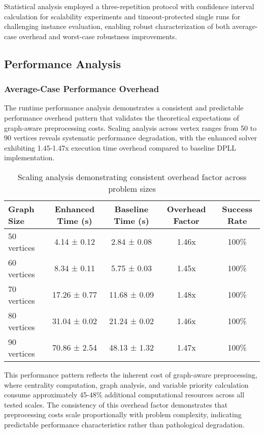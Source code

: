 Statistical analysis employed a three-repetition protocol with confidence interval calculation for scalability experiments and timeout-protected single runs for challenging instance evaluation, enabling robust characterization of both average-case overhead and worst-case robustness improvements.

\subsection{Performance Analysis}

\subsubsection{Average-Case Performance Overhead}

The runtime performance analysis demonstrates a consistent and predictable performance overhead pattern that validates the theoretical expectations of graph-aware preprocessing costs. Scaling analysis across vertex ranges from 50 to 90 vertices reveals systematic performance degradation, with the enhanced solver exhibiting 1.45-1.47x execution time overhead compared to baseline DPLL implementation.

\begin{table}[h]
\centering
\begin{tabular}{|l|c|c|c|c|}
\hline
\textbf{Graph Size} & \textbf{Enhanced Time (s)} & \textbf{Baseline Time (s)} & \textbf{Overhead Factor} & \textbf{Success Rate} \\
\hline
50 vertices & 4.14 ± 0.12 & 2.84 ± 0.08 & 1.46x & 100\% \\
60 vertices & 8.34 ± 0.11 & 5.75 ± 0.03 & 1.45x & 100\% \\
70 vertices & 17.26 ± 0.77 & 11.68 ± 0.09 & 1.48x & 100\% \\
80 vertices & 31.04 ± 0.02 & 21.24 ± 0.02 & 1.46x & 100\% \\
90 vertices & 70.86 ± 2.54 & 48.13 ± 1.32 & 1.47x & 100\% \\
\hline
\end{tabular}
\caption{Scaling analysis demonstrating consistent overhead factor across problem sizes}
\label{tab:scaling_performance}
\end{table}

This performance pattern reflects the inherent cost of graph-aware preprocessing, where centrality computation, graph analysis, and variable priority calculation consume approximately 45-48\% additional computational resources across all tested scales. The consistency of this overhead factor demonstrates that preprocessing costs scale proportionally with problem complexity, indicating predictable performance characteristics rather than pathological degradation.

